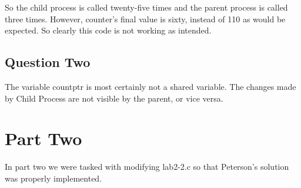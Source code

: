 \documentclass[12pt, titlepage]{article}
\begin{document}
\par{}
So the child process is called twenty-five times and the parent process is called three times.
However, counter's final value is sixty, instead of 110 as would be expected.
So clearly this code is not working as intended.
\subsection*{Question Two}
\par{}
The variable countptr is most certainly not a shared variable.
The changes made by Child Process are not visible by the parent, or vice versa.
\section*{Part Two}
\par{}
In part two we were tasked with modifying lab2-2.c so that Peterson's solution
was properly implemented.
\end{document}
